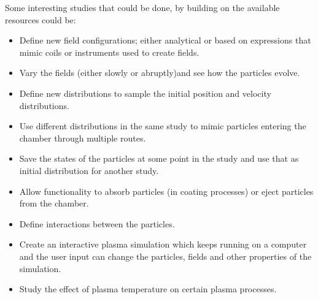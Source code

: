 \documentclass[12pt]{article}
\begin{document}
	\noindent Some interesting studies that could be done, by building on the available resources could be:
	\begin{itemize}
		\item Define new field configurations; either analytical or based on expressions that mimic coils or instruments used to create fields.
		\item Vary the fields (either slowly or abruptly)and see how the particles evolve.
		\item Define new distributions to sample the initial position and velocity distributions.
		\item Use different distributions in the same study to mimic particles entering the chamber through multiple routes.
		\item Save the states of the particles at some point in the study and use that as initial distribution for another study.
		\item Allow functionality to absorb particles (in coating processes) or eject particles from the chamber.
		\item Define interactions between the particles.
		\item Create an interactive plasma simulation which keeps running on a computer and the user input can change the particles, fields and other properties of the simulation.
		\item Study the effect of plasma temperature on certain plasma processes.
		
	\end{itemize}
		
\end{document}
